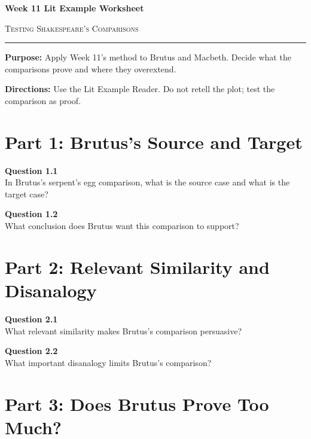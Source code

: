 \documentclass[12pt]{article}
\begin{document}
\begin{center}
{\LARGE\bfseries Week 11 Lit Example Worksheet}\par\vspace{0.05em}
{\large\scshape Testing Shakespeare's Comparisons}\par\vspace{0.12em}
\rule{0.78\textwidth}{0.5pt}
\end{center}

\textbf{Purpose:} Apply Week 11's method to Brutus and Macbeth. Decide what the comparisons prove and where they overextend.

\textbf{Directions:} Use the Lit Example Reader. Do not retell the plot; test the comparison as proof.

\section*{Part 1: Brutus's Source and Target}

\textbf{Question 1.1}\\[-0.15em]
In Brutus's serpent's egg comparison, what is the source case and what is the target case?


\textbf{Question 1.2}\\[-0.15em]
What conclusion does Brutus want this comparison to support?


\newpage

\section*{Part 2: Relevant Similarity and Disanalogy}

\textbf{Question 2.1}\\[-0.15em]
What relevant similarity makes Brutus's comparison persuasive?


\textbf{Question 2.2}\\[-0.15em]
What important disanalogy limits Brutus's comparison?


\newpage

\section*{Part 3: Does Brutus Prove Too Much?}
\end{document}
